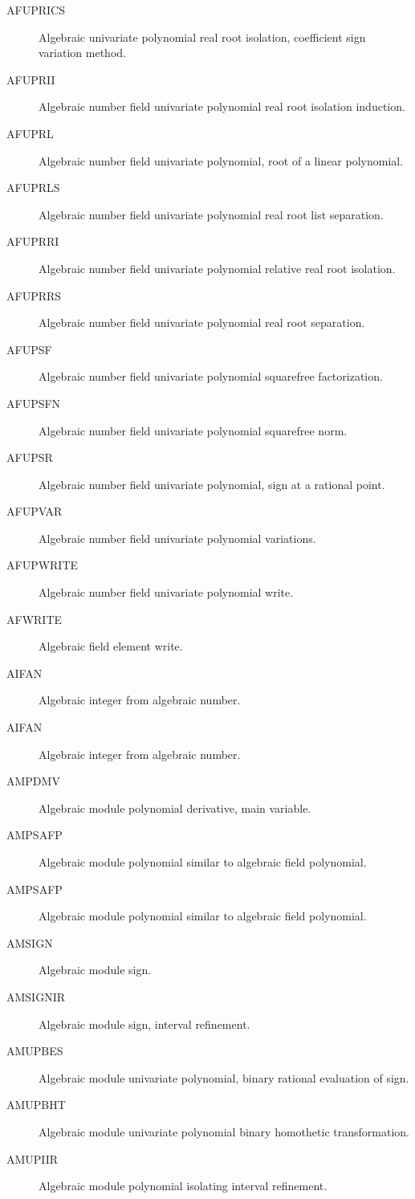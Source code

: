 \begin{description}
\begin{description}
  \item[AFUPRICS]  Algebraic univariate polynomial real root isolation,
    coefficient sign variation method.
  \item[AFUPRII]  Algebraic number field univariate polynomial real root
    isolation induction.
  \item[AFUPRL]  Algebraic number field univariate polynomial, root of a
    linear polynomial.
  \item[AFUPRLS]  Algebraic number field univariate polynomial real root list
    separation.
  \item[AFUPRRI]  Algebraic number field univariate polynomial relative real
    root isolation.
  \item[AFUPRRS]  Algebraic number field univariate polynomial real root
    separation.
  \item[AFUPSF]  Algebraic number field univariate polynomial squarefree
    factorization.
  \item[AFUPSFN]  Algebraic number field univariate polynomial squarefree
    norm.
  \item[AFUPSR]  Algebraic number field univariate polynomial, sign at a
    rational point.
  \item[AFUPVAR]  Algebraic number field univariate polynomial variations.
  \item[AFUPWRITE]  Algebraic number field univariate polynomial write.
  \item[AFWRITE]  Algebraic field element write.
  \item[AIFAN]  Algebraic integer from algebraic number.
  \item[AIFAN]  Algebraic integer from algebraic number.
  \item[AMPDMV]  Algebraic module polynomial derivative, main variable.
  \item[AMPSAFP]  Algebraic module polynomial similar to algebraic field
    polynomial.
  \item[AMPSAFP]  Algebraic module polynomial similar to algebraic field
    polynomial.
  \item[AMSIGN]  Algebraic module sign.
  \item[AMSIGNIR]  Algebraic module sign, interval refinement.
  \item[AMUPBES]  Algebraic module univariate polynomial, binary rational
    evaluation of sign.
  \item[AMUPBHT]  Algebraic module univariate polynomial binary homothetic
    transformation.
  \item[AMUPIIR]  Algebraic module polynomial isolating interval refinement.

\end{description}
\end{description}
